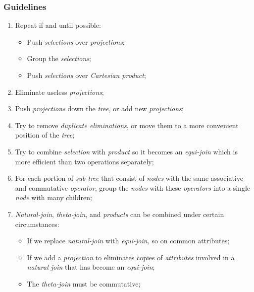 \documentclass{article}
\begin{document}
\subsubsection{Guidelines}
\begin{enumerate}
\item Repeat if and until possible:
\begin{itemize}
\item Push \emph{selections} over \emph{projections};
\item Group the \emph{selections};
\item Push \emph{selections} over \emph{Cartesian product};
\end{itemize}
\item Eliminate useless \emph{projections};
\item Push \emph{projections} down the \emph{tree}, or add new \emph{projections};
\item Try to remove \emph{duplicate eliminations}, or move them to a more convenient position of the \emph{tree};
\item Try to combine \emph{selection} with \emph{product} so it becomes an \emph{equi-join} which is more efficient than two operations separately;
\item For each portion of \emph{sub-tree} that consist of \emph{nodes} with the same associative and commutative \emph{operator}, group the \emph{nodes} with these \emph{operators} into a single \emph{node} with many children;
\item \emph{Natural-join}, \emph{theta-join}, and \emph{products} can be combined under certain circumstances:
\begin{itemize}
\item If we replace \emph{natural-join} with \emph{equi-join,} so on common attributes;
\item If we add a \emph{projection} to eliminates copies of \emph{attributes} involved in a \emph{natural join} that has become an \emph{equi-join};
\item The \emph{theta-join} must be commutative;
\end{itemize}
\end{enumerate}
\end{document}

